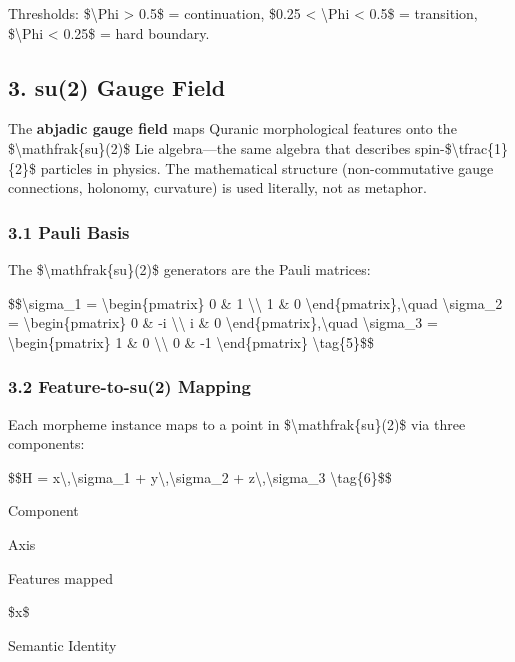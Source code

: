 \documentclass[12pt,a4paper]{article}
\begin{document}
Thresholds: \$\textbackslash Phi \textgreater{} 0.5\$ = continuation,
\$0.25 \textless{} \textbackslash Phi \textless{} 0.5\$ = transition,
\$\textbackslash Phi \textless{} 0.25\$ = hard boundary.

\subsection{3. su(2) Gauge Field}\label{gauge}

The \textbf{abjadic gauge field} maps Quranic morphological features
onto the \$\textbackslash mathfrak\{su\}(2)\$ Lie algebra---the same
algebra that describes spin-\$\textbackslash tfrac\{1\}\{2\}\$ particles
in physics. The mathematical structure (non-commutative gauge
connections, holonomy, curvature) is used literally, not as metaphor.

\subsubsection{3.1 Pauli Basis}\label{pauli-basis}

The \$\textbackslash mathfrak\{su\}(2)\$ generators are the Pauli
matrices:

\$\$\textbackslash sigma\_1 = \textbackslash begin\{pmatrix\} 0 \& 1
\textbackslash\textbackslash{} 1 \& 0
\textbackslash end\{pmatrix\},\textbackslash quad
\textbackslash sigma\_2 = \textbackslash begin\{pmatrix\} 0 \& -i
\textbackslash\textbackslash{} i \& 0
\textbackslash end\{pmatrix\},\textbackslash quad
\textbackslash sigma\_3 = \textbackslash begin\{pmatrix\} 1 \& 0
\textbackslash\textbackslash{} 0 \& -1 \textbackslash end\{pmatrix\}
\textbackslash tag\{5\}\$\$

\subsubsection{3.2 Feature-to-su(2)
Mapping}\label{feature-to-su2-mapping}

Each morpheme instance maps to a point in
\$\textbackslash mathfrak\{su\}(2)\$ via three components:

\$\$H = x\textbackslash,\textbackslash sigma\_1 +
y\textbackslash,\textbackslash sigma\_2 +
z\textbackslash,\textbackslash sigma\_3 \textbackslash tag\{6\}\$\$

Component

Axis

Features mapped

\$x\$

Semantic Identity
\end{document}
